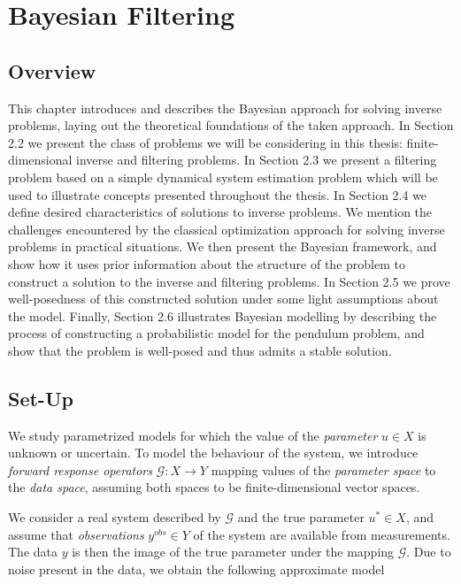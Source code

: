 \section{Bayesian Filtering}
\subsection{Overview}

This chapter introduces and describes the Bayesian approach for solving inverse problems, laying out the theoretical foundations of the taken approach. In Section 2.2 we present the class of problems we will be considering in this thesis: finite-dimensional inverse and filtering problems. In Section 2.3 we present a filtering problem based on a simple dynamical system estimation problem which will be used to illustrate concepts presented throughout the thesis. In Section 2.4 we define desired characteristics of solutions to inverse problems. We mention the challenges encountered by the classical optimization approach for solving inverse problems in practical situations. We then present the Bayesian framework, and show how it uses prior information about the structure of the problem to construct a solution to the inverse and filtering problems. In Section 2.5 we prove well-posedness of this constructed solution under some light assumptions about the model. Finally, Section 2.6 illustrates Bayesian modelling by describing the process of constructing a probabilistic model for the pendulum problem, and show that the problem is well-posed and thus admits a stable solution.

\subsection{Set-Up}

We study parametrized models for which the value of the \textit{parameter} $u \in X$ is unknown or uncertain. To model the behaviour of the system, we introduce \textit{forward response operators} $\mathcal{G} : X \rightarrow Y$ mapping values of the \textit{parameter space} to the \textit{data space}, assuming both spaces to be finite-dimensional vector spaces.

We consider a real system described by $\mathcal{G}$ and the true parameter $u^* \in X$, and assume that \textit{observations} $y^{obs} \in Y$ of the system are available from measurements. The data $y$ is then the image of the true parameter under the mapping $\mathcal{G}$. Due to noise present in the data, we obtain the following approximate model

